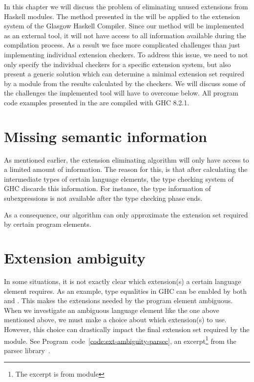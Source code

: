 \documentclass[main.tex]{subfiles}
\begin{document}
	
	In this chapter we will discuss the problem of eliminating unused extensions from Haskell modules. The method presented in the \paper{} will be applied to the extension system of the Glasgow Haskell Compiler. Since our method will be implemented as an external tool, it will not have access to all information available during the compilation process. As a result we face more complicated challenges than just implementing individual extension checkers. To address this issue, we need to not only specify the individual checkers for a specific extension system, but also present a generic solution which can determine a minimal extension set required by a module from the results calculated by the checkers. We will discuss some of the challenges the implemented tool will have to overcome below. All program code examples presented in the \paper{} are compiled with GHC 8.2.1.
	
	\section{Missing semantic information}
	
	As mentioned earlier, the extension eliminating algorithm will only have access to a limited amount of information. The reason for this, is that after calculating the intermediate types of certain language elements, the type checking system of GHC discards this information. For instance, the type information of subexpressions is not available after the type checking phase ends.
	
	As a consequence, our algorithm can only approximate the extension set required by certain program elements.
	
	\section{Extension ambiguity} \label{extension-ambiguity}
	
	In some situations, it is not exactly clear which extension(s) a certain language element requires. As an example, type equalities in GHC can be enabled by both  and . This makes the extensions needed by the program element ambiguous. When we investigate an ambiguous language element like the one above mentioned above, we must make a choice about which extension(s) to use. However, this choice can drastically impact the final extension set required by the module. See Program~code~\ref{code:ext-ambiguity-parsec}, an excerpt\footnote{The excerpt is from module } from the parsec library~\cite{parsec}.
	
\end{document}
